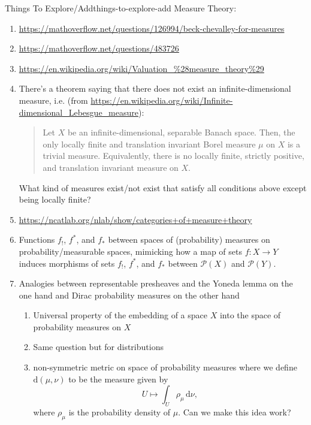 \begin{remark}{Things To Explore/Add}{things-to-explore-add}
    Measure Theory:
    \begin{enumerate}
        \item \url{https://mathoverflow.net/questions/126994/beck-chevalley-for-measures}
        \item \url{https://mathoverflow.net/questions/483726}
        \item \url{https://en.wikipedia.org/wiki/Valuation_\%28measure_theory\%29}
        \item There's a theorem saying that there does not exist an infinite-dimensional  measure, i.e. (from \url{https://en.wikipedia.org/wiki/Infinite-dimensional_Lebesgue_measure}):
            \begin{quote}
                Let $X$ be an infinite-dimensional, separable Banach space. Then, the only locally finite and translation invariant Borel measure $\mu$ on $X$ is a trivial measure. Equivalently, there is no locally finite, strictly positive, and translation invariant measure on $X$.
            \end{quote}
            What kind of measures exist/not exist that satisfy all conditions above except being locally finite?
        \item \url{https://ncatlab.org/nlab/show/categories+of+measure+theory}
        \item Functions $f_{!}$, $f^{*}$, and $f_{*}$ between spaces of (probability) measures on probability/measurable spaces, mimicking how a map of sets $f\colon X\to Y$ induces morphisms of sets $f_{!}$, $f^{*}$, and $f_{*}$ between $\mathcal{P}(X)$ and $\mathcal{P}(Y)$.
        \item Analogies between representable presheaves and the Yoneda lemma on the one hand and Dirac probability measures on the other hand
            \begin{enumerate}
                \item Universal property of the embedding of a space $X$ into the space of probability measures on $X$
                \item Same question but for distributions
                \item non-symmetric metric on space of probability measures where we define $\mathrm{d}(\mu,\nu)$ to be the measure given by
                    \[
                        U%
                        \mapsto%
                        \int_{U}\rho_{\mu}\,\mathrm{d}\nu,%
                    \]%
                    where $\rho_{\mu}$ is the probability density of $\mu$. Can we make this idea work?

\end{enumerate}
\end{enumerate}
\end{remark}
